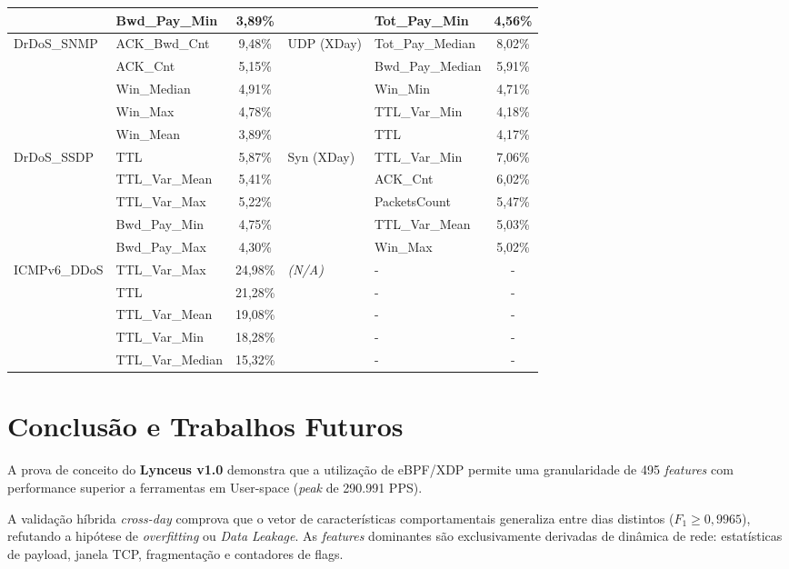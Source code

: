 \documentclass[12pt,a4paper]{article}
\begin{document}
\begin{center}
\begin{longtable}{p{2.8cm} l c | p{2.8cm} l c}
             & Bwd\_Pay\_Min & 3,89\% &                & Tot\_Pay\_Min & 4,56\% \\
\midrule
DrDoS\_SNMP   & ACK\_Bwd\_Cnt & 9,48\% & UDP (XDay)  & Tot\_Pay\_Median & 8,02\% \\
             & ACK\_Cnt & 5,15\% &             & Bwd\_Pay\_Median & 5,91\% \\
             & Win\_Median & 4,91\% &             & Win\_Min & 4,71\% \\
             & Win\_Max & 4,78\% &             & TTL\_Var\_Min & 4,18\% \\
             & Win\_Mean & 3,89\% &             & TTL & 4,17\% \\
\midrule
DrDoS\_SSDP   & TTL & 5,87\% & Syn (XDay)  & TTL\_Var\_Min & 7,06\% \\
             & TTL\_Var\_Mean & 5,41\% &             & ACK\_Cnt & 6,02\% \\
             & TTL\_Var\_Max & 5,22\% &             & PacketsCount & 5,47\% \\
             & Bwd\_Pay\_Min & 4,75\% &             & TTL\_Var\_Mean & 5,03\% \\
             & Bwd\_Pay\_Max & 4,30\% &             & Win\_Max & 5,02\% \\
\midrule
ICMPv6\_DDoS & TTL\_Var\_Max & 24,98\% & \textit{(N/A)} & - & - \\
             & TTL & 21,28\% &                & - & - \\
             & TTL\_Var\_Mean & 19,08\% &                & - & - \\
             & TTL\_Var\_Min & 18,28\% &                & - & - \\
             & TTL\_Var\_Median & 15,32\% &                & - & - \\
\bottomrule
\end{longtable}
\end{center}

\section{Conclus\~{a}o e Trabalhos Futuros}

A prova de conceito do \textbf{Lynceus v1.0} demonstra que a utiliza\c{c}\~{a}o de eBPF/XDP permite uma granularidade de 495 \textit{features} com performance superior a ferramentas em User-space (\textit{peak} de 290.991 PPS).

A valida\c{c}\~{a}o h\'{i}brida \textit{cross-day} comprova que o vetor de caracter\'{i}sticas comportamentais generaliza entre dias distintos ($F_1 \geq 0{,}9965$), refutando a hip\'{o}tese de \textit{overfitting} ou \textit{Data Leakage}. As \textit{features} dominantes s\~{a}o exclusivamente derivadas de din\^{a}mica de rede: estat\'{i}sticas de payload, janela TCP, fragmenta\c{c}\~{a}o e contadores de flags.
\end{document}
